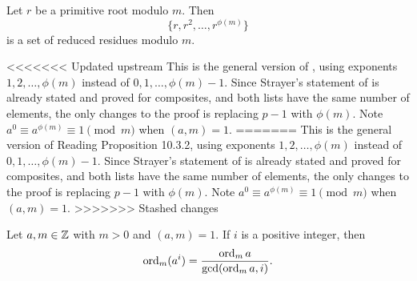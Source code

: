 \documentclass{ximera}
\begin{document}
\begin{proposition}\label{prop:prime-roots-generate}
    Let $r$ be a primitive root modulo $m.$ Then \[\{r,r^2,\dots,r^{\phi(m)}\}\]
    is a set of reduced residues modulo $m.$
\end{proposition}
<<<<<<< Updated upstream
This is the general version of , using exponents $1,2,\dots,\phi(m)$ instead of $0,1,\dots,\phi(m)-1$. Since Strayer's statement of  is already stated and proved for composites, and both lists have the same number of elements, the only changes to the proof is replacing $p-1$ with $\phi(m).$ Note $a^0\equiv a^{\phi(m)}\equiv 1\pmod{m}$ when $(a,m)=1.$
=======
This is the general version of Reading Proposition 10.3.2, using exponents $1,2,\dots,\phi(m)$ instead of $0,1,\dots,\phi(m)-1$. Since Strayer's statement of  is already stated and proved for composites, and both lists have the same number of elements, the only changes to the proof is replacing $p-1$ with $\phi(m).$ Note $a^0\equiv a^{\phi(m)}\equiv 1\pmod{m}$ when $(a,m)=1.$
>>>>>>> Stashed changes


\begin{proposition}\label{prop:compare-order}
    Let $a,m\in\mathbb Z$ with $m>0$ and $(a,m)=1.$ If $i$ is a positive integer, then 
    \[\operatorname{ord}_m(a^i)=\frac{\operatorname{ord}_m a}{\gcd(\operatorname{ord}_m a,i)}.\]
\end{proposition}
\end{document}
